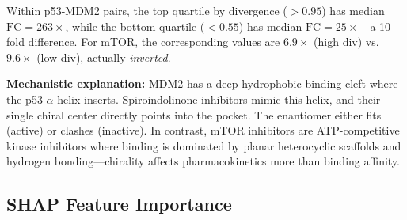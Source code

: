\documentclass[11pt,a4paper]{article}
\newcommand{\FC}{\text{FC}}
\begin{document}
\noindent Within p53-MDM2 pairs, the top quartile by divergence ($>0.95$)
has median $\FC = 263\times$, while the bottom quartile ($<0.55$) has
median $\FC = 25\times$---a 10-fold difference. For mTOR, the corresponding
values are $6.9\times$ (high div) vs.\ $9.6\times$ (low div), actually
\emph{inverted}.

\textbf{Mechanistic explanation:} MDM2 has a deep hydrophobic binding cleft
where the p53 $\alpha$-helix inserts. Spiroindolinone inhibitors mimic this
helix, and their single chiral center directly points into the pocket.
The enantiomer either fits (active) or clashes (inactive). In contrast,
mTOR inhibitors are ATP-competitive kinase inhibitors where binding is
dominated by planar heterocyclic scaffolds and hydrogen bonding---chirality
affects pharmacokinetics more than binding affinity.

\subsection{SHAP Feature Importance}
\end{document}
